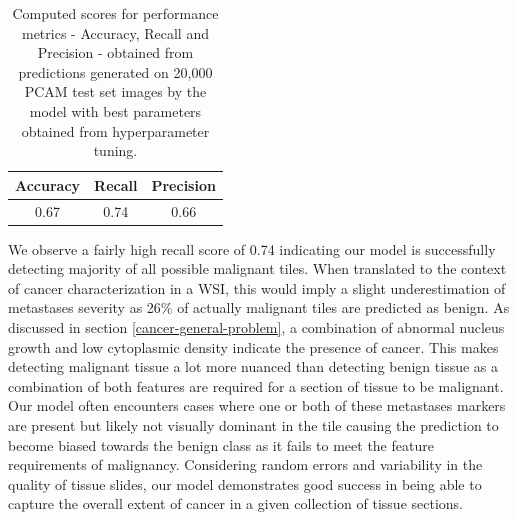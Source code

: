 \documentclass{l4proj}
\begin{document}
\begin{table}[h]
    \centering
    \begin{tabular}{c|c|c}
         Accuracy&Recall&Precision  \\ \hline
         0.67&0.74&0.66 
    \end{tabular}
    \caption{Computed scores for performance metrics - Accuracy, Recall and Precision - obtained from predictions generated on 20,000 PCAM test set images by the model with best parameters obtained from hyperparameter tuning.}
    \label{tab:metric-data}
\end{table}

We observe a fairly high recall score of 0.74 indicating our model is successfully detecting majority of all possible malignant tiles. When translated to the context of cancer characterization in a WSI, this would imply a slight underestimation of metastases severity as 26\% of actually malignant tiles are predicted as benign. As discussed in section \ref{cancer-general-problem}, a combination of abnormal nucleus growth and low cytoplasmic density indicate the presence of cancer. This makes detecting malignant tissue a lot more nuanced than detecting benign tissue as a combination of both features are required for a section of tissue to be malignant. Our model often encounters cases where one or both of these metastases markers are present but likely not visually dominant in the tile causing the prediction to become biased towards the benign class as it fails to meet the feature requirements of malignancy. Considering random errors and variability in the quality of tissue slides, our model demonstrates good success in being able to capture the overall extent of cancer in a given collection of tissue sections. 
\end{document}
